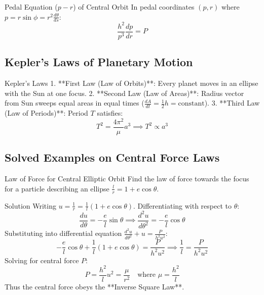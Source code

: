 \documentclass[11pt,a4paper]{article}
\begin{document}
\begin{theorembox}{Pedal Equation ($p-r$) of Central Orbit}
In pedal coordinates $(p, r)$ where $p = r\sin\phi = r^2 \frac{d\theta}{ds}$:
\begin{equation}
\frac{h^2}{p^3} \frac{dp}{dr} = P
\end{equation}
\end{theorembox}

\subsection{Kepler's Laws of Planetary Motion}

\begin{theorembox}{Kepler's Laws}
1. **First Law (Law of Orbits)**: Every planet moves in an ellipse with the Sun at one focus.
2. **Second Law (Law of Areas)**: Radius vector from Sun sweeps equal areas in equal times ($\frac{dA}{dt} = \frac{1}{2}h = \text{constant}$).
3. **Third Law (Law of Periods)**: Period $T$ satisfies:
\begin{equation}
T^2 = \frac{4\pi^2}{\mu} a^3 \implies T^2 \propto a^3
\end{equation}
\end{theorembox}

\subsection{Solved Examples on Central Force Laws}

\begin{examplebox}{Law of Force for Central Elliptic Orbit}
Find the law of force towards the focus for a particle describing an ellipse $\frac{l}{r} = 1 + e\cos\theta$.
\end{examplebox}

\begin{proofbox}{Solution}
Writing $u = \frac{1}{r} = \frac{1}{l}(1 + e\cos\theta)$.
Differentiating with respect to $\theta$:
\[
\frac{du}{d\theta} = -\frac{e}{l}\sin\theta \implies \frac{d^2 u}{d\theta^2} = -\frac{e}{l}\cos\theta
\]
Substituting into differential equation $\frac{d^2 u}{d\theta^2} + u = \frac{P}{h^2 u^2}$:
\[
-\frac{e}{l}\cos\theta + \frac{1}{l}(1 + e\cos\theta) = \frac{P}{h^2 u^2} \implies \frac{1}{l} = \frac{P}{h^2 u^2}
\]
Solving for central force $P$:
\begin{equation}
P = \frac{h^2}{l} u^2 = \frac{\mu}{r^2} \quad \text{where } \mu = \frac{h^2}{l}
\end{equation}
Thus the central force obeys the **Inverse Square Law**.
\end{proofbox}
\end{document}
